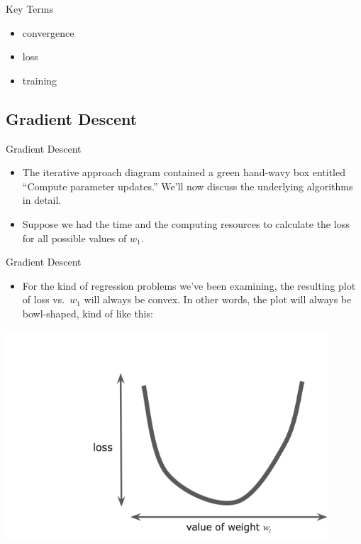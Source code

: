 \documentclass{beamer}
\begin{document}
\begin{frame}{Key Terms}
\begin{itemize}
    \item convergence
    \item loss
    \item training
\end{itemize}
\end{frame}

\subsection{Gradient Descent}

\begin{frame}{Gradient Descent}
\begin{itemize}
    \item The iterative approach diagram contained a green hand-wavy box entitled ``Compute parameter updates.'' We'll now discuss the underlying algorithms in detail.
    
    \item Suppose we had the time and the computing resources to calculate the loss for all possible values of $w_1$. 
    
\end{itemize}
\end{frame}

\begin{frame}{Gradient Descent}
\begin{itemize}
    \item For the kind of regression problems we've been examining, the resulting plot of loss vs.~$w_1$ will always be convex. In other words, the plot will always be bowl-shaped, kind of like this: 
\end{itemize}
\includegraphics[width=0.9\textwidth]{images/convex.png}
\end{frame}
\end{document}
